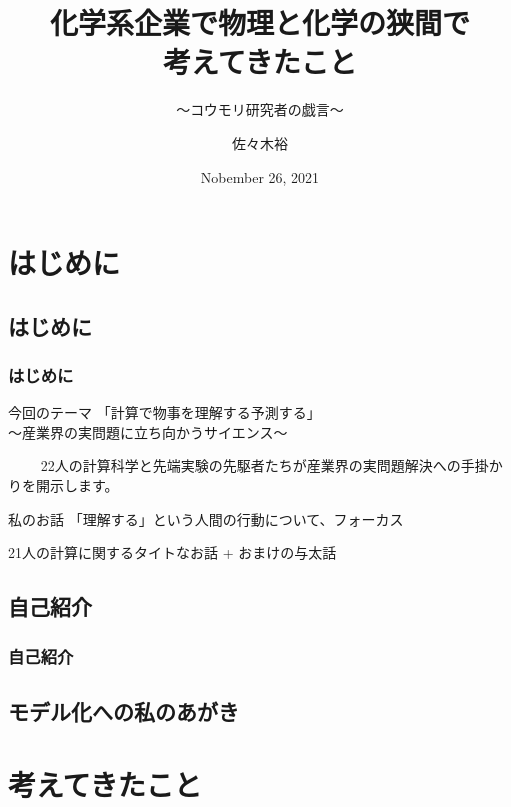 \documentclass[12pt, dvipdfmx]{beamer}
\title
{化学系企業で物理と化学の狭間で\\考えてきたこと}
\subtitle{～コウモリ研究者の戯言～}
\author[東亞合成　佐々木]{佐々木裕}
\institute[東亞合成]{東亞合成}
\date{Nobember 26, 2021}
\begin{document}
\begin{frame}\frametitle{}
	\titlepage
\end{frame}

\section{はじめに}
\subsection{はじめに}
\begin{frame}
    \frametitle{はじめに}
    \begin{block}{今回のテーマ}
        「計算で物事を理解する予測する」\\
        ～産業界の実問題に立ち向かうサイエンス～

　　    22人の計算科学と先端実験の先駆者たちが産業界の実問題解決への手掛かりを開示します。
    \end{block}
    
    \begin{exampleblock}{私のお話}
        「理解する」という人間の行動について、フォーカス

        21人の計算に関するタイトなお話 + おまけの与太話
    \end{exampleblock}
\end{frame}


\subsection{自己紹介}

\begin{frame}
	\frametitle{自己紹介}
\end{frame}

\subsection{モデル化への私のあがき}


\section{考えてきたこと}
\end{document}
